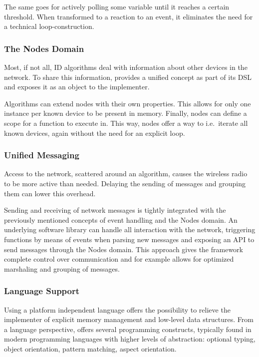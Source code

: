 \documentclass[conference]{IEEEtran}
\begin{document}
The same goes for actively polling some variable until it reaches a certain
threshold. When transformed to a reaction to an event, it eliminates the need
for a technical loop-construction.

\subsubsection{The Nodes Domain}

Most, if not all, ID algorithms deal with information about other devices in
the network. To share this information, \NAME provides a unified 
concept as part of its DSL and exposes it as an object to the implementer.

Algorithms can extend nodes with their own properties. This allows for only one
instance per known device to be present in memory. Finally, nodes can define a
scope for a function to execute in. This way, nodes offer a way to i.e.\
iterate all known devices, again without the need for an explicit loop.

\subsubsection{Unified Messaging}
\label{dsl-unified-msg}

Access to the network, scattered around an algorithm, causes the wireless radio
to be more active than needed. Delaying the sending of messages and grouping
them can lower this overhead.

Sending and receiving of network messages is tightly integrated with the
previously mentioned concepts of event handling and the Nodes domain. An
underlying software library can handle all interaction with the network,
triggering functions by means of events when parsing new messages and exposing
an API to send messages through the Nodes domain. This approach gives the
framework complete control over communication and for example allows for
optimized marshaling and grouping of messages.

\subsubsection{Language Support}
\label{language-support}

Using a platform independent language offers the possibility to relieve the
implementer of explicit memory management and low-level data structures. From a
language perspective, \NAME offers several programming constructs, typically
found in modern programming languages with higher levels of abstraction:
optional typing, object orientation, pattern matching, aspect orientation.
\end{document}

